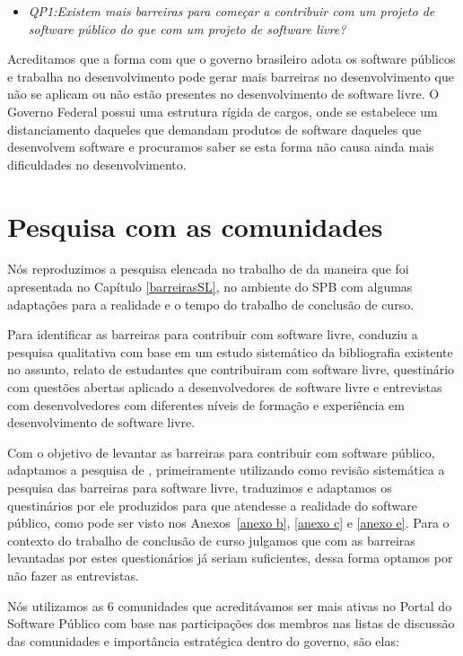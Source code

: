 \begin{itemize}
\item \emph{QP1:Existem mais barreiras para começar a contribuir 
com um projeto de software público do que com um projeto de software livre?}

\end{itemize}

Acreditamos que a forma com que o governo brasileiro adota os software públicos
e trabalha no desenvolvimento pode gerar mais barreiras no desenvolvimento que 
não se aplicam ou não estão presentes no desenvolvimento de software livre. O
Governo Federal possui uma estrutura rígida de cargos, onde se estabelece um
distanciamento daqueles que demandam produtos de software daqueles que desenvolvem
software e procuramos saber se esta forma não causa ainda mais dificuldades no 
desenvolvimento.

\section{Pesquisa com as comunidades}

Nós reproduzimos a pesquisa elencada no trabalho de  
da maneira que foi apresentada no Capítulo \ref{barreirasSL}, no ambiente
do SPB com algumas adaptações para a realidade e o tempo do trabalho de conclusão
de curso.

Para identificar as barreiras para contribuir com software livre,  conduziu a 
pesquisa qualitativa com base em um estudo sistemático da bibliografia existente no
assunto, relato de estudantes que contribuiram com software livre, questinário com 
questões abertas aplicado a desenvolvedores de software livre e entrevistas com 
desenvolvedores com diferentes níveis de formação e experiência em desenvolvimento
de software livre.
 
Com o objetivo de levantar as barreiras para contribuir com software público, adaptamos
a pesquisa de , primeiramente utilizando como revisão sistemática a pesquisa 
das barreiras para software livre, traduzimos e adaptamos os questinários
por ele produzidos para que atendesse a realidade do software público, como pode ser 
visto nos Anexos~\ref{anexo b}, \ref{anexo c} e \ref{anexo e}. Para o contexto do 
trabalho de conclusão de curso julgamos que com as barreiras levantadas por estes 
questionários já seriam suficientes, dessa forma optamos por não fazer as entrevistas.

Nós utilizamos as 6 comunidades que acreditávamos ser mais ativas
no Portal do Software Público com base nas participações dos membros nas listas de 
discussão das comunidades e importância estratégica dentro do governo, são elas:

